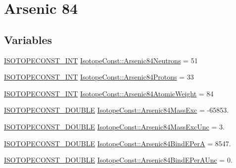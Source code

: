 \hypertarget{group___isotope_const-_arsenic-_as84}{}\section{Arsenic 84}
\label{group___isotope_const-_arsenic-_as84}
\subsection*{Variables}
\begin{DoxyCompactItemize}
\item 
\mbox{\hyperlink{group___isotope_const-_macros_ga5f18360b3e99483a35c32d789e62621c}{I\+S\+O\+T\+O\+P\+E\+C\+O\+N\+S\+T\+\_\+\+I\+NT}} \mbox{\hyperlink{group___isotope_const-_arsenic-_as84_gae2891f85d3c9b2010c1cbfaf7b9c9c00}{Isotope\+Const\+::\+Arsenic84\+Neutrons}} = 51
\item 
\mbox{\hyperlink{group___isotope_const-_macros_ga5f18360b3e99483a35c32d789e62621c}{I\+S\+O\+T\+O\+P\+E\+C\+O\+N\+S\+T\+\_\+\+I\+NT}} \mbox{\hyperlink{group___isotope_const-_arsenic-_as84_ga4734d64701c8feea43ea3da60c64ca5d}{Isotope\+Const\+::\+Arsenic84\+Protons}} = 33
\item 
\mbox{\hyperlink{group___isotope_const-_macros_ga5f18360b3e99483a35c32d789e62621c}{I\+S\+O\+T\+O\+P\+E\+C\+O\+N\+S\+T\+\_\+\+I\+NT}} \mbox{\hyperlink{group___isotope_const-_arsenic-_as84_gaafa53192938b593b509604439ecf42c2}{Isotope\+Const\+::\+Arsenic84\+Atomic\+Weight}} = 84
\item 
\mbox{\hyperlink{group___isotope_const-_macros_ga8f45a7272ce02c0b4c65c44636ed719a}{I\+S\+O\+T\+O\+P\+E\+C\+O\+N\+S\+T\+\_\+\+D\+O\+U\+B\+LE}} \mbox{\hyperlink{group___isotope_const-_arsenic-_as84_ga0ed113ee7026860920c41739c7399df2}{Isotope\+Const\+::\+Arsenic84\+Mass\+Exc}} = -\/65853.
\item 
\mbox{\hyperlink{group___isotope_const-_macros_ga8f45a7272ce02c0b4c65c44636ed719a}{I\+S\+O\+T\+O\+P\+E\+C\+O\+N\+S\+T\+\_\+\+D\+O\+U\+B\+LE}} \mbox{\hyperlink{group___isotope_const-_arsenic-_as84_ga8b21015adcc60f618b2e21a52a9dc25a}{Isotope\+Const\+::\+Arsenic84\+Mass\+Exc\+Unc}} = 3.
\item 
\mbox{\hyperlink{group___isotope_const-_macros_ga8f45a7272ce02c0b4c65c44636ed719a}{I\+S\+O\+T\+O\+P\+E\+C\+O\+N\+S\+T\+\_\+\+D\+O\+U\+B\+LE}} \mbox{\hyperlink{group___isotope_const-_arsenic-_as84_ga3573c742d2c0679b55e3147ae4162d41}{Isotope\+Const\+::\+Arsenic84\+Bind\+E\+PerA}} = 8547.
\item 
\mbox{\hyperlink{group___isotope_const-_macros_ga8f45a7272ce02c0b4c65c44636ed719a}{I\+S\+O\+T\+O\+P\+E\+C\+O\+N\+S\+T\+\_\+\+D\+O\+U\+B\+LE}} \mbox{\hyperlink{group___isotope_const-_arsenic-_as84_ga94442c0614554c5d43f026a892ccb92a}{Isotope\+Const\+::\+Arsenic84\+Bind\+E\+Per\+A\+Unc}} = 0.

\end{DoxyCompactItemize}
